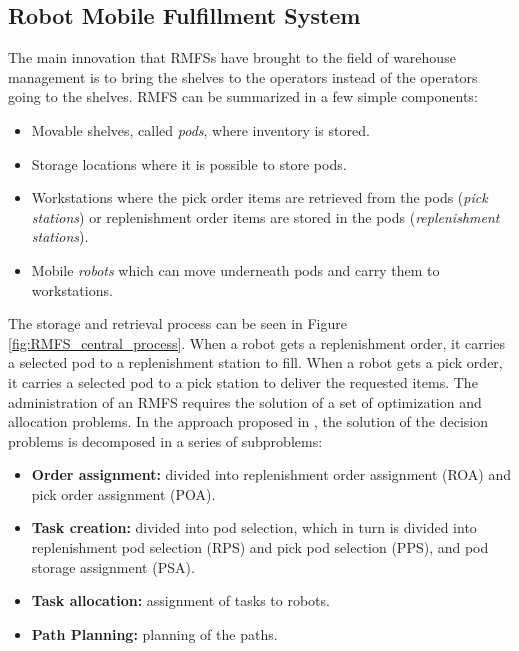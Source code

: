 \documentclass[../../Thesis.tex]{subfiles}
\begin{document}
		\subsection{Robot Mobile Fulfillment System}
		\label{sec:Data_collection:Robot_Mobile_Fulfillment_System}
			The main innovation that RMFSs have brought to the field of warehouse management is to bring the shelves to the operators instead of the operators going to the shelves. RMFS can be summarized in a few simple components:
			\begin{itemize}
				\item Movable shelves, called \textit{pods}, where inventory is stored.
				\item Storage locations where it is possible to store pods.
				\item Workstations where the pick order items are retrieved from the pods (\textit{pick stations}) or replenishment order items are stored in the pods (\textit{replenishment stations}).
				\item Mobile \textit{robots} which can move underneath pods and carry them to workstations.
			\end{itemize}
			The storage and retrieval process can be seen in Figure \ref{fig:RMFS_central_process}.  When a robot gets a replenishment order, it carries a selected pod to a replenishment station to fill. When a robot gets a pick order, it carries a selected pod to a pick station to deliver the requested items. The administration of an RMFS requires the solution of a set of optimization and allocation problems.  In the approach proposed in \cite{Merschformann2018}, the solution of the decision problems is decomposed in a series of subproblems:
			\begin{itemize}
				\item \textbf{Order assignment:} divided into replenishment order assignment (ROA) and pick order assignment (POA).
				\item \textbf{Task creation:} divided into pod selection, which in turn is divided into replenishment pod selection (RPS) and pick pod selection (PPS), and pod storage assignment (PSA).
				\item \textbf{Task allocation:} assignment of tasks to robots.
				\item \textbf{Path Planning:} planning of the paths.
			\end{itemize}
			
\end{document}
